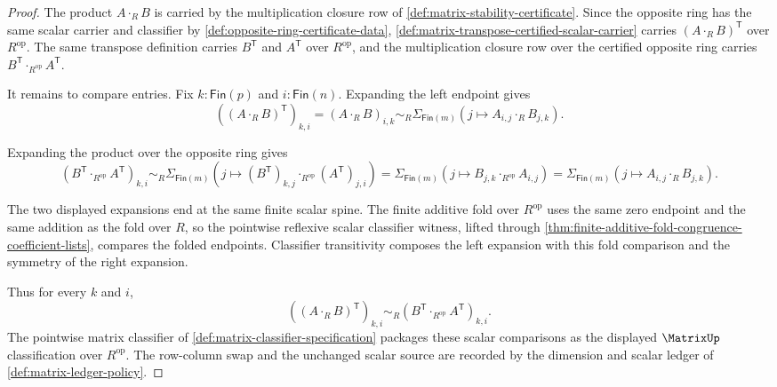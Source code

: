 \begin{proof}
The product $A\cdot_RB$ is carried by the multiplication closure row of \autoref{def:matrix-stability-certificate}. Since the opposite ring has the same scalar carrier and classifier by \autoref{def:opposite-ring-certificate-data}, \autoref{def:matrix-transpose-certified-scalar-carrier} carries $(A\cdot_RB)^{\mathsf{T}}$ over $R^{\mathrm{op}}$. The same transpose definition carries $B^{\mathsf{T}}$ and $A^{\mathsf{T}}$ over $R^{\mathrm{op}}$, and the multiplication closure row over the certified opposite ring carries $B^{\mathsf{T}}\cdot_{R^{\mathrm{op}}}A^{\mathsf{T}}$.

It remains to compare entries. Fix $k:\mathsf{Fin}(p)$ and $i:\mathsf{Fin}(n)$. Expanding the left endpoint gives
$$
((A\cdot_RB)^{\mathsf{T}})_{k,i}
=
(A\cdot_RB)_{i,k}
\sim_R
\Sigma_{\mathsf{Fin}(m)}(j\mapsto A_{i,j}\cdot_RB_{j,k}).
$$

Expanding the product over the opposite ring gives
$$
(B^{\mathsf{T}}\cdot_{R^{\mathrm{op}}}A^{\mathsf{T}})_{k,i}
\sim_R
\Sigma_{\mathsf{Fin}(m)}(j\mapsto (B^{\mathsf{T}})_{k,j}\cdot_{R^{\mathrm{op}}}(A^{\mathsf{T}})_{j,i})
=
\Sigma_{\mathsf{Fin}(m)}(j\mapsto B_{j,k}\cdot_{R^{\mathrm{op}}}A_{i,j})
=
\Sigma_{\mathsf{Fin}(m)}(j\mapsto A_{i,j}\cdot_RB_{j,k}).
$$

The two displayed expansions end at the same finite scalar spine. The finite additive fold over $R^{\mathrm{op}}$ uses the same zero endpoint and the same addition as the fold over $R$, so the pointwise reflexive scalar classifier witness, lifted through \autoref{thm:finite-additive-fold-congruence-coefficient-lists}, compares the folded endpoints. Classifier transitivity composes the left expansion with this fold comparison and the symmetry of the right expansion.

Thus for every $k$ and $i$,
$$
((A\cdot_RB)^{\mathsf{T}})_{k,i}
\sim_R
(B^{\mathsf{T}}\cdot_{R^{\mathrm{op}}}A^{\mathsf{T}})_{k,i}.
$$
The pointwise matrix classifier of \autoref{def:matrix-classifier-specification} packages these scalar comparisons as the displayed $\MatrixUp$ classification over $R^{\mathrm{op}}$. The row-column swap and the unchanged scalar source are recorded by the dimension and scalar ledger of \autoref{def:matrix-ledger-policy}.
\end{proof}
